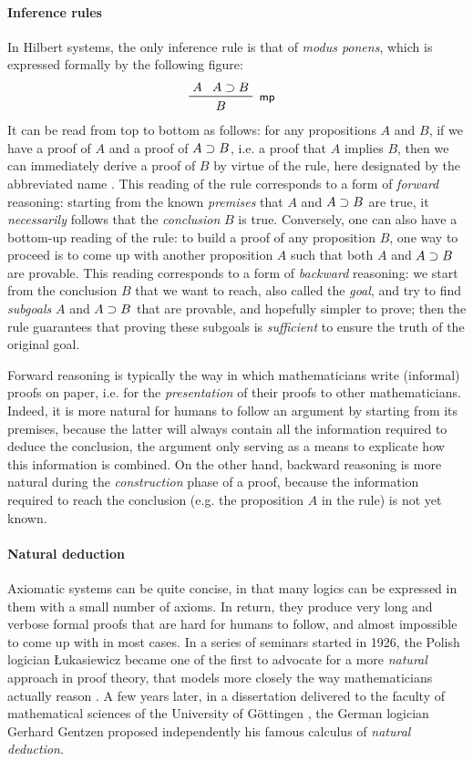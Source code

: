 \paragraph{Inference rules}

In Hilbert systems, the only inference rule is that of \emph{modus ponens},
which is expressed formally by the following figure:
$$\R[\rsf{mp}]{A}{A \limp B}{B}$$ It can be read from top to bottom as follows:
for any propositions $A$ and $B$, if we have a proof of $A$ and a proof of $A
\supset B$, i.e. a proof that $A$ implies $B$, then we can immediately derive a
proof of $B$ by virtue of the rule, here designated by the abbreviated name
. This reading of the rule corresponds to a form of \emph{forward}
reasoning: starting from the known \emph{premises} that $A$ and $A \supset B$ are
true, it \emph{necessarily} follows that the \emph{conclusion} $B$ is true.
Conversely, one can also have a bottom-up reading of the rule: to build a proof
of any proposition $B$, one way to proceed is to come up with another
proposition $A$ such that both $A$ and $A \supset B$ are provable. This reading
corresponds to a form of \emph{backward} reasoning: we start from the conclusion
$B$ that we want to reach, also called the \emph{goal}, and try to find
\emph{subgoals} $A$ and $A \supset B$ that are provable, and hopefully simpler to
prove; then the rule guarantees that proving these subgoals is \emph{sufficient}
to ensure the truth of the original goal.

Forward reasoning is typically the way in which mathematicians write (informal)
proofs on paper, i.e. for the \emph{presentation} of their proofs to other
mathematicians. Indeed, it is more natural for humans to follow an argument by
starting from its premises, because the latter will always contain all the
information required to deduce the conclusion, the argument only serving as a
means to explicate how this information is combined. On the other hand, backward
reasoning is more natural during the \emph{construction} phase of a proof,
because the information required to reach the conclusion (e.g. the proposition
$A$ in the  rule) is not yet known.

\paragraph{Natural deduction}

Axiomatic systems can be quite concise, in that many logics can be expressed in
them with a small number of axioms. In return, they produce very long and
verbose formal proofs that are hard for humans to follow, and almost impossible
to come up with in most cases. In a series of seminars started in 1926, the
Polish logician Łukasiewicz became one of the first to advocate for a more
\emph{natural} approach in proof theory, that models more closely the way
mathematicians actually reason . A few years
later, in a dissertation delivered to the faculty of mathematical sciences of
the University of Göttingen , the German
logician Gerhard Gentzen proposed independently his famous calculus of
\emph{natural deduction}.

